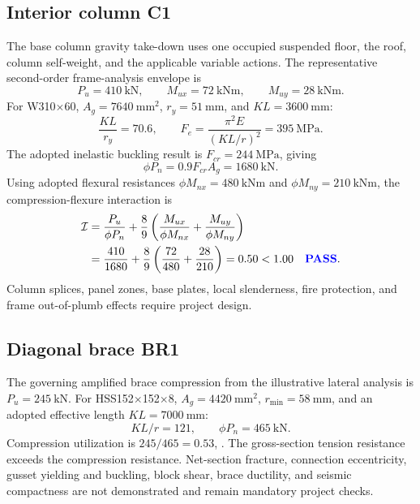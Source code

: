 \subsection{Interior column C1}
The base column gravity take-down uses one occupied suspended floor, the roof,
column self-weight, and the applicable variable actions. The representative
second-order frame-analysis envelope is
\begin{equation}
  P_u=\SI{410}{\kilo\newton},\qquad
  M_{ux}=\SI{72}{\kilo\newton\metre},\qquad
  M_{uy}=\SI{28}{\kilo\newton\metre}.
\end{equation}
For W310$\times$60, $A_g=\SI{7640}{\milli\metre\squared}$,
$r_y=\SI{51}{\milli\metre}$, and $KL=\SI{3600}{\milli\metre}$:
\begin{equation}
  \frac{KL}{r_y}=70.6, \qquad
  F_e=\frac{\pi^2E}{(KL/r)^2}=\SI{395}{\mega\pascal}.
\end{equation}
The adopted inelastic buckling result is $F_{cr}=\SI{244}{\mega\pascal}$, giving
\begin{equation}
  \phi P_n=0.9F_{cr}A_g=\SI{1680}{\kilo\newton}.
\end{equation}
Using adopted flexural resistances
$\phi M_{nx}=\SI{480}{\kilo\newton\metre}$ and
$\phi M_{ny}=\SI{210}{\kilo\newton\metre}$, the compression-flexure interaction is
\begin{align}
  \mathcal{I}
  &=\frac{P_u}{\phi P_n}
  +\frac{8}{9}\left(
    \frac{M_{ux}}{\phi M_{nx}}+
    \frac{M_{uy}}{\phi M_{ny}}\right) \\
  &=\frac{410}{1680}
  +\frac{8}{9}\left(\frac{72}{480}+\frac{28}{210}\right)
  =0.50 < 1.00 \quad \textcolor{blue}{\textbf{PASS}}.
\end{align}
Column splices, panel zones, base plates, local slenderness, fire protection, and
frame out-of-plumb effects require project design.

\subsection{Diagonal brace BR1}
The governing amplified brace compression from the illustrative lateral analysis is
$P_u=\SI{245}{\kilo\newton}$. For HSS152$\times$152$\times$8,
$A_g=\SI{4420}{\milli\metre\squared}$, $r_{\min}=\SI{58}{\milli\metre}$, and an
adopted effective length $KL=\SI{7000}{\milli\metre}$:
\begin{equation}
  KL/r=121,\qquad \phi P_n=\SI{465}{\kilo\newton}.
\end{equation}
Compression utilization is $245/465=0.53$, \ok. The gross-section tension
resistance exceeds the compression resistance. Net-section fracture, connection
eccentricity, gusset yielding and buckling, block shear, brace ductility, and
seismic compactness are not demonstrated and remain mandatory project checks.

